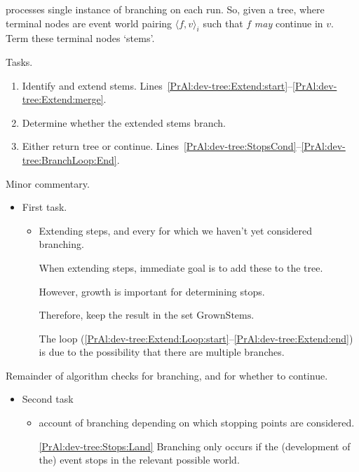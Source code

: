 \begin{note}
  \AlgDevelopTree{} processes single instance of branching on each run.
  So, given a tree, where terminal nodes are event world pairing \(\langle f,v \rangle_{i}\) such that \(f\) \emph{may} continue in \(v\).
  Term these terminal nodes `stems'.

  Tasks.
  \begin{enumerate}
  \item
    Identify and extend stems.%
    \hfill%
    Lines~\ref{PrAl:dev-tree:Extend:start}--\ref{PrAl:dev-tree:Extend:merge}.
  \item
    Determine whether the extended stems branch.%
    \hfill%
  \item
    Either return tree or continue.%
    \hfill%
    Lines~\ref{PrAl:dev-tree:StopsCond}--\ref{PrAl:dev-tree:BranchLoop:End}.
  \end{enumerate}

  Minor commentary.

  \begin{itemize}
  \item
    First task.
    \begin{itemize}
    \item
      Extending steps, and every for which we haven't yet considered branching.

      When extending steps, immediate goal is to add these to the tree.

      However, growth is important for determining stops.

      Therefore, keep the result in the set \(\text{GrownStems}\).

      The loop (\ref{PrAl:dev-tree:Extend:Loop:start}--\ref{PrAl:dev-tree:Extend:end}) is due to the possibility that there are multiple branches.
    \end{itemize}
  \end{itemize}

  Remainder of algorithm checks for branching, and for whether to continue.

  \begin{itemize}
  \item
    Second task
    \begin{itemize}
    \item
      account of branching depending on which stopping points are considered.

      \autoref{PrAl:dev-tree:Stops:Land} \citeauthor{Landman:1992wh} Branching only occurs if the (development of the) event stops in the relevant possible world.



\end{itemize}
\end{itemize}
\end{note}

